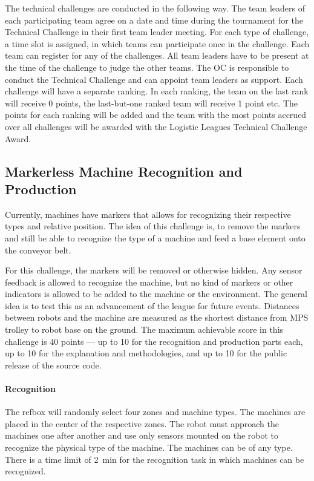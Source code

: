 \documentclass[12pt,twoside]{article}
\begin{document}
The technical challenges are conducted in the following way. The team
leaders of each participating team agree on a date and time during the
tournament for the Technical Challenge in their first team leader
meeting. For each type of challenge, a time slot is assigned, in which
teams can participate once in the challenge. Each team can register
for any of the challenges. All team leaders have to be present at the
time of the challenge to judge the other teams. The OC is responsible
to conduct the Technical Challenge and can appoint team leaders as
support. Each challenge will have a separate ranking. In each ranking,
the team on the last rank will receive 0 points, the last-but-one
ranked team will receive 1 point etc. The points for each ranking will
be added and the team with the most points accrued over all challenges
will be awarded with the Logistic Leagues Technical Challenge Award.



\subsection{Markerless Machine Recognition and Production}
Currently, machines have markers that allows for recognizing their
respective types and relative position. The idea of this challenge is,
to remove the markers and still be able to recognize the type of a
machine and feed a base element onto the conveyor belt.

For this challenge, the markers will be removed or otherwise
hidden. Any sensor feedback is allowed to recognize the machine, but
no kind of markers or other indicators is allowed to be added to the
machine or the environment. The general idea is to test this as an
advancement of the league for future events. Distances between robots
and the machine are measured as the shortest distance from MPS trolley
to robot base on the ground. The maximum achievable score in this
challenge is 40 points --- up to 10 for the recognition and production
parts each, up to 10 for the explanation and methodologies, and up to
10 for the public release of the source code.

\vspace{-2ex}\paragraph{Recognition}
The refbox will randomly select four zones and machine types. The
machines are placed in the center of the respective zones. The robot
must approach the machines one after another and use only sensors
mounted on the robot to recognize the physical type of the
machine. The machines can be of any type. There is a time limit of
\SI{2}{\minute} for the recognition task in which machines can be recognized.
\end{document}
